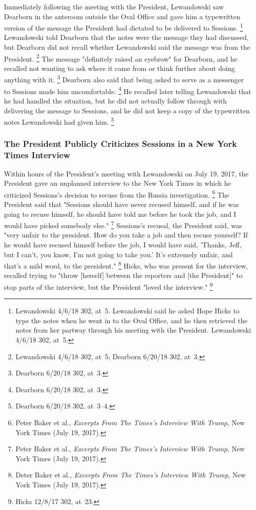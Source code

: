 {Immediately following the meeting with the President, Lewandowski saw Dearborn in the anteroom outside the Oval Office and gave him a typewritten version of the message the President had dictated to be delivered to Sessions.%
\footnote{Lewandowski 4/6/18 302, at~5.
Lewandowski said he asked Hope Hicks to type the notes when he went in to the Oval Office, and he then retrieved the notes from her partway through his meeting with the President.
Lewandowski 4/6/18 302, at~5.}
Lewandowski told Dearborn that the notes were the message they had discussed, but Dearborn did not recall whether Lewandowski said the message was from the President.%
\footnote{Lewandowski 4/6/18 302, at~5;
Dearborn 6/20/18 302, at~3.}
The message "definitely raised an eyebrow" for Dearborn, and he recalled not wanting to ask where it came from or think further about doing anything with it.%
\footnote{Dearborn 6/20/18 302, at~3.}
Dearborn also said that being asked to serve as a messenger to Sessions made him uncomfortable.%
\footnote{Dearborn 6/20/18 302, at~3.}
He recalled later telling Lewandowski that he had handled the situation, but he did not actually follow through with delivering the message to Sessions, and he did not keep a copy of the typewritten notes Lewandowski had given him.%
\footnote{Dearborn 6/20/18 302, at~3--4.}

\subsubsection{The President Publicly Criticizes Sessions in a New York Times Interview}

Within hours of the President's meeting with Lewandowski on July 19, 2017, the President gave an unplanned interview to the New York Times in which he criticized Sessions's decision to recuse from the Russia investigation.%
\footnote{Peter Baker et al., \textit{Excerpts From The Times's Interview With Trump}, New York Times (July 19, 2017).}
The President said that "Sessions should have never recused himself, and if he was going to recuse himself, he should have told me before he took the job, and I would have picked somebody else."%
\footnote{Peter Baker et al., \textit{Excerpts From The Times's Interview With Trump}, New York Times (July 19, 2017).}
Sessions's recusal, the President said, was "very unfair to the president.
How do you take a job and then recuse yourself?
If he would have recused himself before the job, I would have said, 'Thanks, Jeff, but I can't, you know, I'm not going to take you.'
It's extremely unfair, and that's a mild word, to the president."%
\footnote{Deter Baker et al., \textit{Excerpts From The Times's Interview With Trump}, New York Times (July 19, 2017).}
Hicks, who was present for the interview, recalled trying to "throw [herself] between the reporters and [the President]" to stop parts of the interview, but the President "loved the interview."%
\footnote{Hicks 12/8/17 302, at~23.}

}
